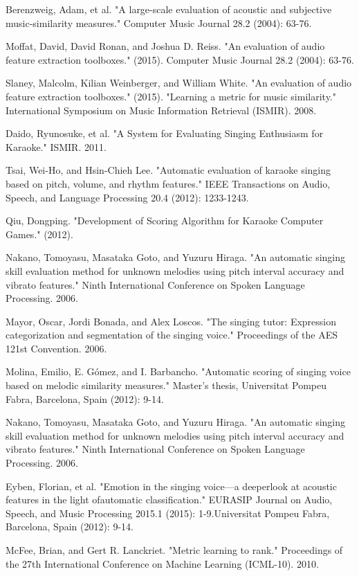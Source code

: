 \documentclass[paper=a4, fontsize=11pt, DIV=13]{scrartcl}
\begin{document}
\begin{thebibliography}{99}
 Berenzweig, Adam, et al.
\newblock "A large-scale evaluation of acoustic and subjective music-similarity measures."
\newblock Computer Music Journal 28.2 (2004): 63-76.

 Moffat, David, David Ronan, and Joshua D. Reiss.
\newblock "An evaluation of audio feature extraction toolboxes." (2015). Computer Music Journal 28.2 (2004): 63-76.

 Slaney, Malcolm, Kilian Weinberger, and William White.
\newblock "An evaluation of audio feature extraction toolboxes." (2015).
\newblock "Learning a metric for music similarity." International Symposium on Music Information Retrieval (ISMIR). 2008.

 Daido, Ryunosuke, et al. "A System for Evaluating Singing Enthusiasm for Karaoke." ISMIR. 2011.

 Tsai, Wei-Ho, and Hsin-Chieh Lee. "Automatic evaluation of karaoke singing based on pitch, volume, and rhythm features." IEEE Transactions on Audio, Speech, and Language Processing 20.4 (2012): 1233-1243.

 Qiu, Dongping. "Development of Scoring Algorithm for Karaoke Computer Games." (2012).

 Nakano, Tomoyasu, Masataka Goto, and Yuzuru Hiraga. "An automatic singing skill evaluation method for unknown melodies using pitch interval accuracy and vibrato features." Ninth International Conference on Spoken Language Processing. 2006.

 Mayor, Oscar, Jordi Bonada, and Alex Loscos. "The singing tutor: Expression categorization and segmentation of the singing voice." Proceedings of the AES 121st Convention. 2006.

 Molina, Emilio, E. Gómez, and I. Barbancho. "Automatic scoring of singing voice based on melodic similarity measures." Master's thesis, Universitat Pompeu Fabra, Barcelona, Spain (2012): 9-14.

 Nakano, Tomoyasu, Masataka Goto, and Yuzuru Hiraga. "An automatic singing skill evaluation method for unknown melodies using pitch interval accuracy and vibrato features." Ninth International Conference on Spoken Language Processing. 2006.

 Eyben, Florian, et al. "Emotion in the singing voice—a deeperlook at acoustic features in the light ofautomatic classification." EURASIP Journal on Audio, Speech, and Music Processing 2015.1 (2015): 1-9.Universitat Pompeu Fabra, Barcelona, Spain (2012): 9-14.

 McFee, Brian, and Gert R. Lanckriet. "Metric learning to rank." Proceedings of the 27th International Conference on Machine Learning (ICML-10). 2010.

\end{thebibliography}
\end{document}
